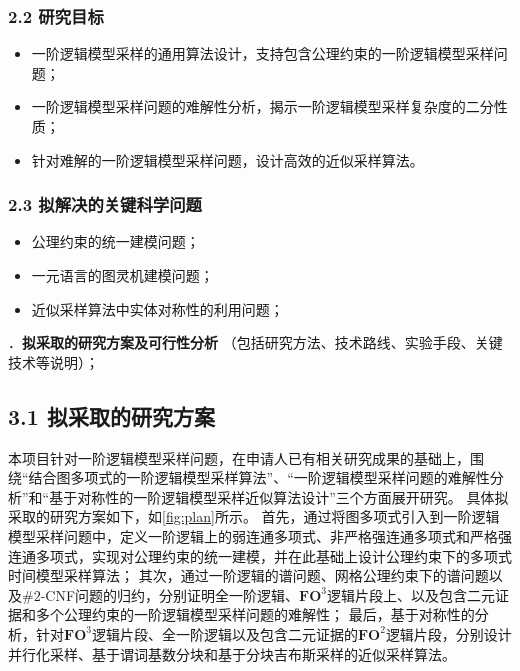 \documentclass[12pt,UTF8,AutoFakeBold=3,a4paper]{ctexart} %
\newcommand{\fotwo}{\ensuremath{\mathbf{FO}^2}}
\newcommand{\fothree}{\ensuremath{\mathbf{FO}^3}}
\begin{document}
\subsubsection{2.2 研究目标}

\begin{itemize}
  \item 一阶逻辑模型采样的通用算法设计，支持包含公理约束的一阶逻辑模型采样问题；
  \item 一阶逻辑模型采样问题的难解性分析，揭示一阶逻辑模型采样复杂度的二分性质；
  \item 针对难解的一阶逻辑模型采样问题，设计高效的近似采样算法。
\end{itemize}

\subsubsection{2.3 拟解决的关键科学问题}

\begin{itemize}
  \item 公理约束的统一建模问题；
  \item 一元语言的图灵机建模问题；
  \item 近似采样算法中实体对称性的利用问题；
\end{itemize}


\newpage

{\sihao \color{MsBlue} ．{\bfseries 拟采取的研究方案及可行性分析} （包括研究方法、技术路线、实验手段、关键技术等说明）；}

\subsection{3.1 拟采取的研究方案}

本项目针对一阶逻辑模型采样问题，在申请人已有相关研究成果的基础上，围绕``结合图多项式的一阶逻辑模型采样算法''、``一阶逻辑模型采样问题的难解性分析''和``基于对称性的一阶逻辑模型采样近似算法设计''三个方面展开研究。
具体拟采取的研究方案如下，如\cref{fig:plan}所示。
首先，通过将图多项式引入到一阶逻辑模型采样问题中，定义一阶逻辑上的弱连通多项式、非严格强连通多项式和严格强连通多项式，实现对公理约束的统一建模，并在此基础上设计公理约束下的多项式时间模型采样算法；
其次，通过一阶逻辑的谱问题、网格公理约束下的谱问题以及$\#2$-CNF问题的归约，分别证明全一阶逻辑、\fothree{}逻辑片段上、以及包含二元证据和多个公理约束的一阶逻辑模型采样问题的难解性；
最后，基于对称性的分析，针对\fothree{}逻辑片段、全一阶逻辑以及包含二元证据的\fotwo{}逻辑片段，分别设计并行化采样、基于谓词基数分块和基于分块吉布斯采样的近似采样算法。
\end{document}
